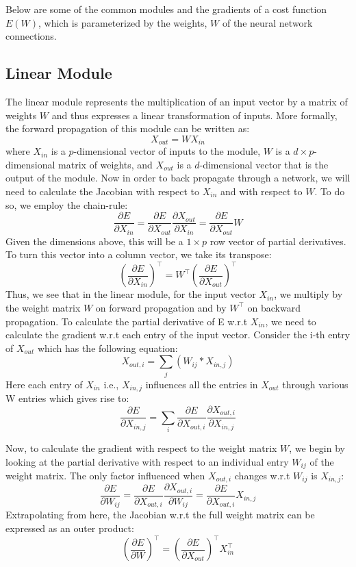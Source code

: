 Below are some of the common modules and the gradients of a cost function $E(W)$, which is parameterized by the weights, $W$ of the neural network connections.

\subsection{Linear Module}

The linear module represents the multiplication of an input vector by a matrix of weights $W$ and thus expresses a linear transformation of inputs. 
More formally, the forward propagation of this module can be written as: $$X_{out} = WX_{in}$$ where $X_{in}$ is a $p$-dimensional vector of inputs to the module, $W$ is a $d \times p$-dimensional matrix of weights, and $X_{out}$ is a $d$-dimensional vector that is the output of the module.
Now in order to back propagate through a network, we will need to calculate the Jacobian with respect to $X_{in}$ and with respect to $W$.
To do so, we employ the chain-rule: $$\frac{\partial E}{\partial X_{in}} = \frac{\partial E}{\partial X_{out}}\frac{\partial X_{out}}{\partial X_{in}} = \frac{\partial E}{\partial X_{out}}W$$ Given the dimensions above, this will be a $1 \times p$ row vector of partial derivatives. To turn this vector into a column vector, we take its transpose: $$\left(\frac{\partial E}{\partial X_{in}}\right)^\top = W^\top \left(\frac{\partial E}{\partial X_{out}}\right)^\top$$ Thus, we see that in the linear module, for the input vector $X_{in}$, we multiply by the weight matrix $W$ on forward propagation and by $W^\top$ on backward propagation.
To calculate the partial derivative of E w.r.t $X_{in}$, we need to calculate the gradient w.r.t each entry of the input vector. Consider the i-th entry of $X_{out}$ which has the following equation:
$$X_{out,i} = \sum_{j}(W_{ij} * X_{in,j})$$ Here each entry of $X_{in}$ i.e., $X_{in,j}$ influences all the entries in $X_{out}$ through various W entries which gives rise to: $$\frac{\partial E}{\partial X_{in, j}} = \sum_{i}\frac{\partial E}{\partial X_{out,i}} \frac{\partial X_{out,i}}{\partial X_{in,j}} $$

Now, to calculate the gradient with respect to the weight matrix $W$, we begin by looking at the partial derivative with respect to an individual entry $W_{ij}$ of the weight matrix. The only factor influenced when $X_{out,i}$ changes w.r.t $W_{ij}$ is $X_{in,j}$:  $$\frac{\partial E}{\partial W_{ij}} = \frac{\partial E}{\partial X_{out, i}}\frac{\partial X_{out, i}}{\partial W_{ij}} = \frac{\partial E}{\partial X_{out, i}}X_{in, j}$$ Extrapolating from here, the Jacobian w.r.t the full weight matrix can be expressed as an outer product: $$\left(\frac{\partial E}{\partial W}\right)^\top = \left(\frac{\partial E}{\partial X_{out}}\right)^\top X_{in}^\top$$

